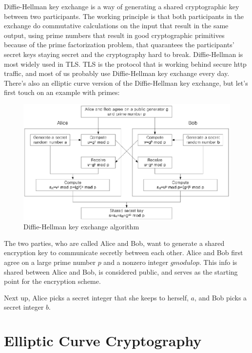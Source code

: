 Diffie-Hellman key exchange is a way of generating a shared cryptographic key between two participants. The working principle is that both participants in the exchange do commutative calculations on the input that result in the same output, using prime numbers that result in good cryptographic primitives because of the prime factorization problem, that quarantees the participants' secret keys staying secret and the cryptography hard to break. Diffie-Hellman is most widely used in TLS. TLS is the protocol that is working behind secure http traffic, and most of us probably use Diffie-Hellman key exchange every day. There's also an elliptic curve version of the Diffie-Hellman key exchange, but let's first touch on an example with primes:

\begin{figure}
	\includegraphics[width=\textwidth]{pictures/diffiehellman.eps}
	\caption{Diffie-Hellman key exchange algorithm\cite{Jeon2014-ag}}
	\label{Diagram, Diffie-Hellman Key Exchange}
\end{figure}

The two parties, who are called Alice and Bob, want to generate a shared encryption key to communicate secretly between each other. Alice and Bob first agree on a large prime number \(p\) and a nonzero integer \(g  modulo  p\). This info is shared between Alice and Bob, is considered public, and serves as the starting point for the encryption scheme.
						
Next up, Alice picks a secret integer that she keeps to herself, \(a\), and Bob picks a secret integer \(b\). 
						

\section{Elliptic Curve Cryptography}
						
